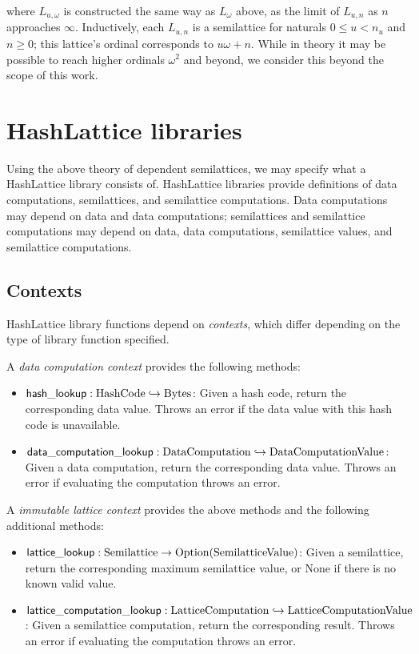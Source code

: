 \documentclass{article}
\begin{document}
      where $L_{u, \omega}$ is constructed the same way as $L_{\omega}$ above, as the limit of $L_{u, n}$ as $n$ approaches $\infty$. Inductively, each $L_{u, n}$ is a semilattice for naturals $0 \leq u < n_u$ and $n \geq 0$; this lattice's ordinal corresponds to $u \omega + n$. While in theory it may be possible to reach higher ordinals $\omega^2$ and beyond, we consider this beyond the scope of this work.

  \section{HashLattice libraries}

    Using the above theory of dependent semilattices, we may specify what a HashLattice library consists of. HashLattice libraries provide definitions of data computations, semilattices, and semilattice computations. Data computations may depend on data and data computations; semilattices and semilattice computations may depend on data, data computations, semilattice values, and semilattice computations.

    \subsection{Contexts}

      HashLattice library functions depend on \emph{contexts}, which differ depending on the type of library function specified.

      A \emph{data computation context} provides the following methods:


      \begin{itemize}
        \item $\mathsf{hash\_lookup} : \mathrm{HashCode} \hookrightarrow \mathrm{Bytes}$: Given a hash code, return the corresponding data value. Throws an error if the data value with this hash code is unavailable.
        \item $\mathsf{data\_computation\_lookup} : \mathrm{DataComputation} \hookrightarrow \mathrm{DataComputationValue}$: Given a data computation, return the corresponding data value. Throws an error if evaluating the computation throws an error.
      \end{itemize}

      A \emph{immutable lattice context} provides the above methods and the following additional methods:


      \begin{itemize}
        \item $\mathsf{lattice\_lookup} : \mathrm{Semilattice} \to \mathrm{Option}(\mathrm{SemilatticeValue})$: Given a semilattice, return the corresponding maximum semilattice value, or $\mathrm{None}$ if there is no known valid value.
        \item $\mathsf{lattice\_computation\_lookup} : \mathrm{LatticeComputation} \hookrightarrow \mathrm{LatticeComputationValue}$: Given a semilattice computation, return the corresponding result. Throws an error if evaluating the computation throws an error.
      \end{itemize}
\end{document}
